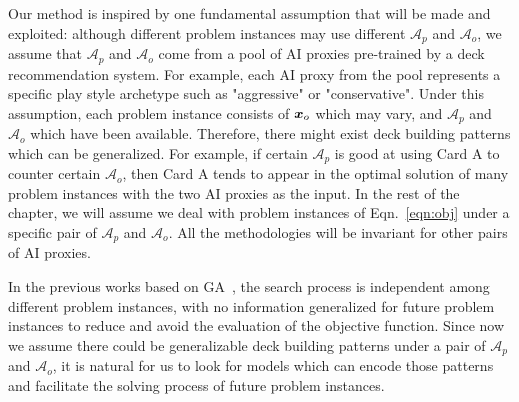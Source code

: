 Our method is inspired by one fundamental assumption that will be made and exploited: although different problem instances may use different $\mathcal{A}_p$ and $\mathcal{A}_o$, we assume that $\mathcal{A}_p$ and $\mathcal{A}_o$ come from a pool of AI proxies pre-trained by a deck recommendation system. For example, each AI proxy from the pool represents a specific play style archetype such as "aggressive" or "conservative". Under this assumption, each problem instance consists of $\boldsymbol{x}_o$ which may vary, and $\mathcal{A}_p$ and $\mathcal{A}_o$ which have been available. Therefore, there might exist deck building patterns which can be generalized. For example, if certain $\mathcal{A}_p$ is good at using Card A to counter certain $\mathcal{A}_o$, then Card A tends to appear in the optimal solution of many problem instances with the two AI proxies as the input. In the rest of the chapter, we will assume we deal with problem instances of Eqn.~\ref{eqn:obj} under a specific pair of $\mathcal{A}_p$ and $\mathcal{A}_o$. All the methodologies will be invariant for other pairs of AI proxies.

In the previous works based on GA~\cite{garcia2016evolutionary,bjorke2017deckbuilding}, the search process is independent among different problem instances, with no information generalized for future problem instances to reduce and avoid the evaluation of the objective function. Since now we assume there could be generalizable deck building patterns under a pair of $\mathcal{A}_p$ and $\mathcal{A}_o$, it is natural for us to look for models which can encode those patterns and facilitate the solving process of future problem instances.

